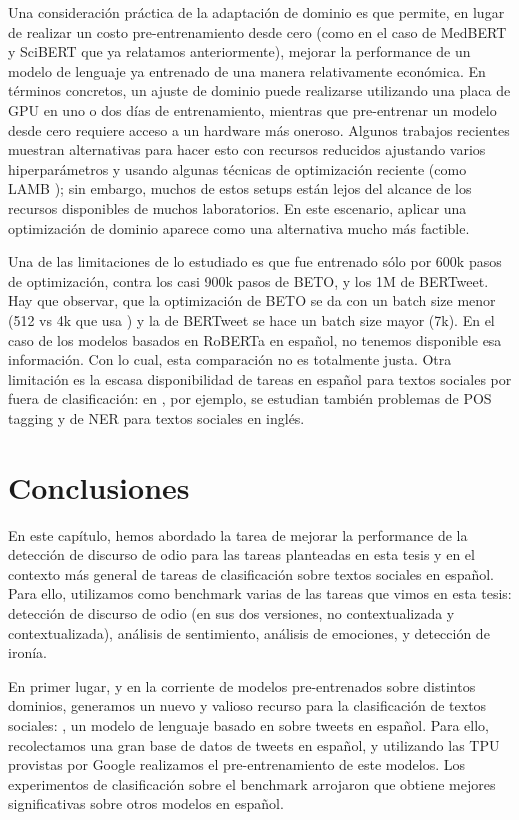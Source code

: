 Una consideración práctica de la adaptación de dominio es que permite, en lugar de realizar un costo pre-entrenamiento desde cero (como en el caso de MedBERT y SciBERT que ya relatamos anteriormente), mejorar la performance de un modelo de lenguaje ya entrenado de una manera relativamente económica. En términos concretos, un ajuste de dominio puede realizarse utilizando una placa de GPU en uno o dos días de entrenamiento, mientras que pre-entrenar un modelo desde cero requiere acceso a un hardware más oneroso. Algunos trabajos recientes \cite{izsak2021train} muestran alternativas para hacer esto con recursos reducidos ajustando varios hiperparámetros y usando algunas técnicas de optimización reciente (como LAMB \cite{you2019large}); sin embargo, muchos de estos setups están lejos del alcance de los recursos disponibles de muchos laboratorios. En este escenario, aplicar una optimización de dominio aparece como una alternativa mucho más factible.

Una de las limitaciones de lo estudiado es que \robertuito{} fue entrenado sólo por 600k pasos de optimización, contra los casi 900k pasos de BETO, y los 1M de BERTweet. Hay que observar, que la optimización de BETO se da con un batch size menor (512 vs 4k que usa \robertuito{}) y la de BERTweet se hace un batch size mayor (7k). En el caso de los modelos basados en RoBERTa en español, no tenemos disponible esa información. Con lo cual, esta comparación no es totalmente justa. Otra limitación es la escasa disponibilidad de tareas en español para textos sociales por fuera de clasificación: en \citet{bertweet}, por ejemplo, se estudian también problemas de POS tagging y de NER para textos sociales en inglés.

\section{Conclusiones}

En este capítulo, hemos abordado la tarea de mejorar la performance de la detección de discurso de odio para las tareas planteadas en esta tesis y en el contexto más general de tareas de clasificación sobre textos sociales en español. Para ello, utilizamos como benchmark varias de las tareas que vimos en esta tesis: detección de discurso de odio (en sus dos versiones, no contextualizada y contextualizada), análisis de sentimiento, análisis de emociones, y detección de ironía.

En primer lugar, y en la corriente de modelos pre-entrenados sobre distintos dominios, generamos un nuevo y valioso recurso para la clasificación de textos sociales: \robertuito{}, un modelo de lenguaje basado en \roberta{} sobre tweets en español. Para ello, recolectamos una gran base de datos de tweets en español, y utilizando las TPU provistas por Google realizamos el pre-entrenamiento de este modelos. Los experimentos de clasificación sobre el benchmark arrojaron que \robertuito{} obtiene mejores significativas sobre otros modelos en español.

